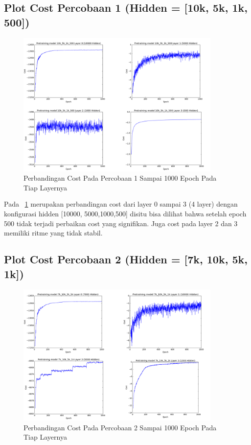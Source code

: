 \subsection{Plot Cost Percobaan 1 (Hidden = [10k, 5k, 1k, 500])}

\begin{figure}
	\centering
	\includegraphics[width=0.9\textwidth]
		{pics/percobaan_1.png}
	\caption{Perbandingan Cost Pada Percobaan 1 Sampai 1000 Epoch Pada Tiap Layernya}
	\label{fig:percobaan1}
\end{figure}

Pada \pic~\ref{fig:percobaan1} merupakan perbandingan cost dari layer 0 sampai 3 (4 layer) dengan konfigurasi hidden [10000, 5000,1000,500] disitu bisa dilihat bahwa setelah epoch 500 tidak terjadi perbaikan cost yang signifikan. Juga cost pada layer 2 dan 3 memiliki ritme yang tidak stabil.

\subsection{Plot Cost Percobaan 2 (Hidden = [7k, 10k, 5k, 1k])}
\begin{figure}
	\centering
	\includegraphics[width=0.9\textwidth]
		{pics/percobaan_2.png}
	\caption{Perbandingan Cost Pada Percobaan 2 Sampai 1000 Epoch Pada Tiap Layernya}
	\label{fig:percobaan2}
\end{figure}

